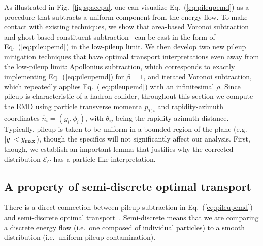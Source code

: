 \documentclass[letterpaper,11pt]{article}
\newcommand{\E}{\mathcal{E}}
\DeclareRobustCommand{\Fig}[1]{Fig.~\ref{#1}}
\DeclareRobustCommand{\Eq}[1]{Eq.~(\ref{#1})}
\begin{document}
As illustrated in \Fig{fig:spacepu}, one can visualize \Eq{eq:pileupemd} as a procedure that subtracts a uniform component from the energy flow.
%
To make contact with existing techniques, we show that area-based Voronoi subtraction~\cite{Cacciari:2007fd,Cacciari:2008gn,Cacciari:2011ma} and ghost-based constituent subtraction~\cite{Berta:2014eza} can be cast in the form of \Eq{eq:pileupemd} in the low-pileup limit.
%
We then develop two new pileup mitigation techniques that have optimal transport interpretations even away from the low-pileup limit: Apollonius subtraction, which corresponds to exactly implementing \Eq{eq:pileupemd} for $\beta=1$, and iterated Voronoi subtraction, which repeatedly applies \Eq{eq:pileupemd} with an infinitesimal $\rho$.
%
Since pileup is characteristic of a hadron collider, throughout this section we compute the EMD using particle transverse momenta $p_{T,i}$ and rapidity-azimuth coordinates $\hat n_i = (y_i,\phi_i)$, with $\theta_{ij}$ being the rapidity-azimuth distance.
%
Typically, pileup is taken to be uniform in a bounded region of the plane (e.g.~$|y|< y_{\rm max}$), though the specifics will not significantly affect our analysis.
%
First, though, we establish an important lemma that justifies why the corrected distribution $\E_C$ has a particle-like interpretation.


\subsection{A property of semi-discrete optimal transport}


There is a direct connection between pileup subtraction in \Eq{eq:pileupemd} and semi-discrete optimal transport~\cite{hartmann2017semi}.
%
Semi-discrete means that we are comparing a discrete energy flow (i.e.~one composed of individual particles) to a smooth distribution (i.e.~uniform pileup contamination).
\end{document}
